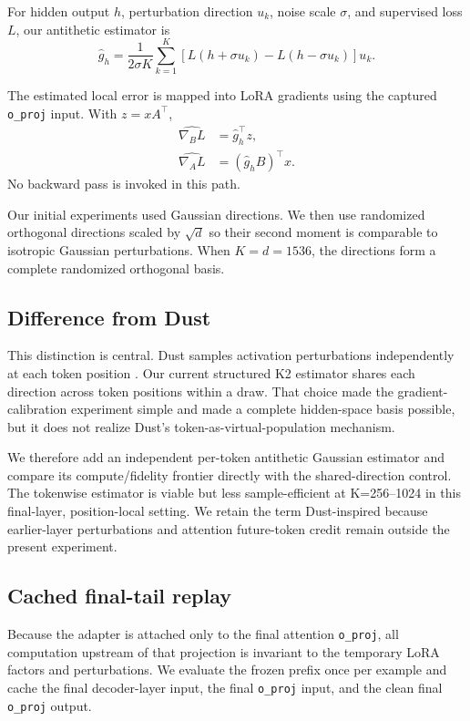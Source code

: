 \documentclass[11pt]{article}
\newcommand{\oproj}{\texttt{o\_proj}}
\begin{document}
For hidden output $h$, perturbation direction $u_k$, noise scale $\sigma$,
and supervised loss $L$, our antithetic estimator is
\begin{equation}
\hat g_h =
\frac{1}{2\sigma K}
\sum_{k=1}^{K}
\left[
L(h+\sigma u_k)-L(h-\sigma u_k)
\right] u_k.
\label{eq:antithetic}
\end{equation}

The estimated local error is mapped into LoRA gradients using the captured
\oproj{} input. With $z=xA^\top$,
\begin{align}
    \widehat{\nabla_B L} &= \hat g_h^\top z, \\
    \widehat{\nabla_A L} &= (\hat g_h B)^\top x.
\end{align}
No backward pass is invoked in this path.

Our initial experiments used Gaussian directions. We then use randomized
orthogonal directions scaled by $\sqrt{d}$ so their second moment is
comparable to isotropic Gaussian perturbations. When $K=d=1536$, the
directions form a complete randomized orthogonal basis.

\subsection{Difference from Dust}

This distinction is central. Dust samples activation perturbations
independently at each token position \citep{dahal2026dust}. Our current
structured K2 estimator shares each direction across token positions within a
draw. That choice made the gradient-calibration experiment simple and made a
complete hidden-space basis possible, but it does not realize Dust's
token-as-virtual-population mechanism.

We therefore add an independent per-token antithetic Gaussian estimator
and compare its compute/fidelity frontier directly with the shared-direction
control. The tokenwise estimator is viable but less sample-efficient at
K=256--1024 in this final-layer, position-local setting. We retain the term
Dust-inspired because earlier-layer perturbations and attention future-token
credit remain outside the present experiment.

\subsection{Cached final-tail replay}

Because the adapter is attached only to the final attention \oproj{}, all
computation upstream of that projection is invariant to the temporary LoRA
factors and perturbations. We evaluate the frozen prefix once per example and
cache the final decoder-layer input, the final \oproj{} input, and the clean
final \oproj{} output.
\end{document}
